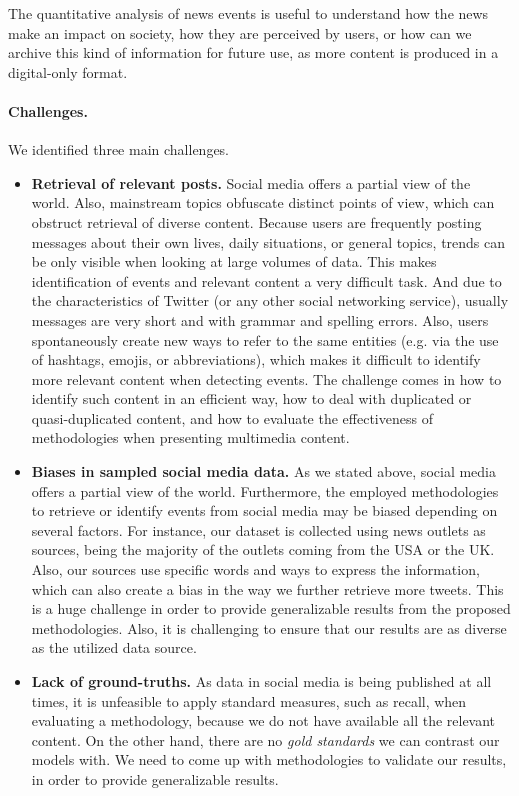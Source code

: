 \documentclass[runningheads]{llncs}
\begin{document}
The quantitative analysis of news events is useful to understand how the news
make an impact on society, how they are perceived by users, or how can we
archive this kind of information for future use, as more content is produced in
a digital-only format.

\paragraph{Challenges.} We identified three main challenges.

\begin{itemize}
    \item {\bf Retrieval of relevant posts.} 
    Social media offers a partial view of the world. 
    Also, mainstream topics obfuscate distinct points of view, which can
    obstruct retrieval of diverse content. 
    Because users are frequently posting messages about their own lives, daily
    situations, or general topics, trends can be only visible when looking at large
    volumes of data. 
    This makes identification of events and relevant content a very difficult task.
    And due to the characteristics of Twitter (or any other social networking
    service), usually messages are very short and with grammar and spelling
    errors. 
    Also, users spontaneously create new ways to refer to the same entities
    (e.g. via the use of hashtags, emojis, or abbreviations), which makes it
    difficult to identify more relevant content when detecting events.
    The challenge comes in how to identify such content in an efficient way, how
    to deal with duplicated or quasi-duplicated content, and how to evaluate the
    effectiveness of methodologies when presenting multimedia content. 

    \item {\bf Biases in sampled social media data.}
    As we stated above, social media offers a partial view of the world. 
    Furthermore, the employed methodologies to retrieve or identify events from
    social media may be biased depending on several factors. 
    For instance, our dataset is collected using news outlets as sources, being
    the majority of the outlets coming from the USA or the UK. 
    Also, our sources use specific words and ways to express the information,
    which can also create a bias in the way we further retrieve more tweets.
    This is a huge challenge in order to provide generalizable results from the
    proposed methodologies. 
    Also, it is challenging to ensure that our results are as diverse as the
    utilized data source. 

    \item {\bf Lack of ground-truths.} 
    As data in social media is being published at all times, it is unfeasible to
    apply standard measures, such as recall, when evaluating a methodology,
    because we do not have available all the relevant content.
    On the other hand, there are no {\em gold standards} we can contrast our
    models with. 
    We need to come up with methodologies to validate our results, in order to
    provide generalizable results.

    
\end{itemize}
\end{document}
